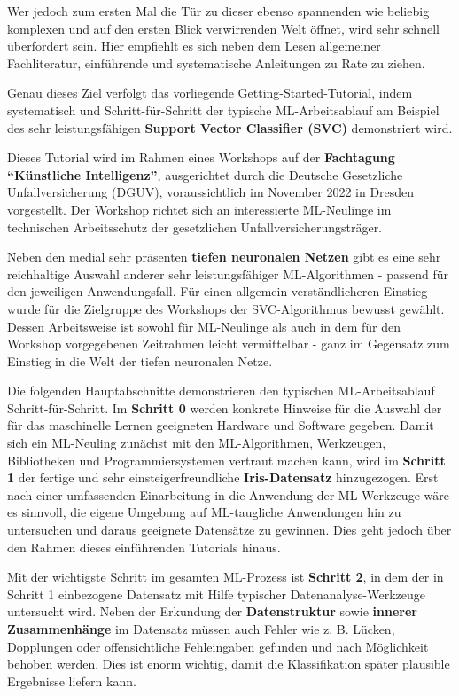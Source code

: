 \documentclass [oneside,10pt,a4paper,ngerman,BCOR10mm,headsepline,parindent,final]{scrartcl}
\begin{document}
Wer jedoch zum ersten Mal die Tür zu dieser ebenso spannenden wie
beliebig komplexen und auf den ersten Blick verwirrenden Welt öffnet,
wird sehr schnell überfordert sein. Hier empfiehlt es sich neben dem
Lesen allgemeiner Fachliteratur, einführende und systematische
Anleitungen zu Rate zu ziehen.

Genau dieses Ziel verfolgt das vorliegende Getting-Started-Tutorial,
indem systematisch und Schritt-für-Schritt der typische ML-Arbeitsablauf
am Beispiel des sehr leistungsfähigen \textbf{Support Vector Classifier
(SVC)} demonstriert wird.

Dieses Tutorial wird im Rahmen eines Workshops auf der
\textbf{Fachtagung ``Künstliche Intelligenz''}, ausgerichtet durch die
Deutsche Gesetzliche Unfallversicherung (DGUV), voraussichtlich im
November 2022 in Dresden vorgestellt. Der Workshop richtet sich an
interessierte ML-Neulinge im technischen Arbeitsschutz der gesetzlichen
Unfallversicherungsträger.

Neben den medial sehr präsenten \textbf{tiefen neuronalen Netzen} gibt
es eine sehr reichhaltige Auswahl anderer sehr leistungsfähiger
ML-Algorithmen - passend für den jeweiligen Anwendungsfall. Für einen
allgemein verständlicheren Einstieg wurde für die Zielgruppe des
Workshops der SVC-Algorithmus bewusst gewählt. Dessen Arbeitsweise ist
sowohl für ML-Neulinge als auch in dem für den Workshop vorgegebenen
Zeitrahmen leicht vermittelbar - ganz im Gegensatz zum Einstieg in die
Welt der tiefen neuronalen Netze.

Die folgenden Hauptabschnitte demonstrieren den typischen
ML-Arbeitsablauf Schritt-für-Schritt. Im \textbf{Schritt 0} werden
konkrete Hinweise für die Auswahl der für das maschinelle Lernen
geeigneten Hardware und Software gegeben. Damit sich ein ML-Neuling
zunächst mit den ML-Algorithmen, Werkzeugen, Bibliotheken und
Programmiersystemen vertraut machen kann, wird im \textbf{Schritt 1} der
fertige und sehr einsteigerfreundliche \textbf{Iris-Datensatz}
hinzugezogen. Erst nach einer umfassenden Einarbeitung in die Anwendung
der ML-Werkzeuge wäre es sinnvoll, die eigene Umgebung auf ML-taugliche
Anwendungen hin zu untersuchen und daraus geeignete Datensätze zu
gewinnen. Dies geht jedoch über den Rahmen dieses einführenden Tutorials
hinaus.

Mit der wichtigste Schritt im gesamten ML-Prozess ist \textbf{Schritt
2}, in dem der in Schritt 1 einbezogene Datensatz mit Hilfe typischer
Datenanalyse-Werkzeuge untersucht wird. Neben der Erkundung der
\textbf{Datenstruktur} sowie \textbf{innerer Zusammenhänge} im Datensatz
müssen auch Fehler wie z. B. Lücken, Dopplungen oder offensichtliche
Fehleingaben gefunden und nach Möglichkeit behoben werden. Dies ist
enorm wichtig, damit die Klassifikation später plausible Ergebnisse
liefern kann.
\end{document}
